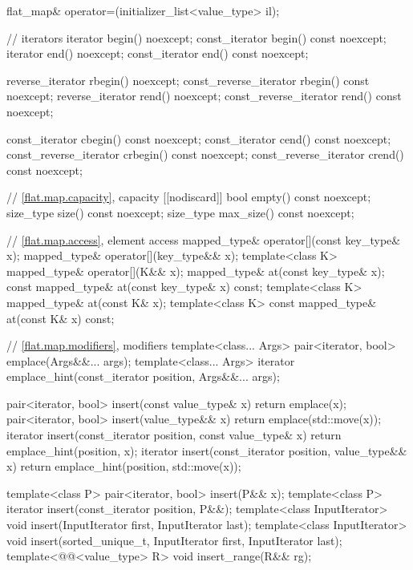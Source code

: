 \begin{codeblock}
{{    flat_map& operator=(initializer_list<value_type> il);

    // iterators
    iterator               begin() noexcept;
    const_iterator         begin() const noexcept;
    iterator               end() noexcept;
    const_iterator         end() const noexcept;

    reverse_iterator       rbegin() noexcept;
    const_reverse_iterator rbegin() const noexcept;
    reverse_iterator       rend() noexcept;
    const_reverse_iterator rend() const noexcept;

    const_iterator         cbegin() const noexcept;
    const_iterator         cend() const noexcept;
    const_reverse_iterator crbegin() const noexcept;
    const_reverse_iterator crend() const noexcept;

    // \ref{flat.map.capacity}, capacity
    [[nodiscard]] bool empty() const noexcept;
    size_type size() const noexcept;
    size_type max_size() const noexcept;

    // \ref{flat.map.access}, element access
    mapped_type& operator[](const key_type& x);
    mapped_type& operator[](key_type&& x);
    template<class K> mapped_type& operator[](K&& x);
    mapped_type& at(const key_type& x);
    const mapped_type& at(const key_type& x) const;
    template<class K> mapped_type& at(const K& x);
    template<class K> const mapped_type& at(const K& x) const;

    // \ref{flat.map.modifiers}, modifiers
    template<class... Args> pair<iterator, bool> emplace(Args&&... args);
    template<class... Args>
      iterator emplace_hint(const_iterator position, Args&&... args);

    pair<iterator, bool> insert(const value_type& x)
      { return emplace(x); }
    pair<iterator, bool> insert(value_type&& x)
      { return emplace(std::move(x)); }
    iterator insert(const_iterator position, const value_type& x)
      { return emplace_hint(position, x); }
    iterator insert(const_iterator position, value_type&& x)
      { return emplace_hint(position, std::move(x)); }

    template<class P> pair<iterator, bool> insert(P&& x);
    template<class P>
      iterator insert(const_iterator position, P&&);
    template<class InputIterator>
      void insert(InputIterator first, InputIterator last);
    template<class InputIterator>
      void insert(sorted_unique_t, InputIterator first, InputIterator last);
    template<@@<value_type> R>
      void insert_range(R&& rg);

}}
\end{codeblock}
